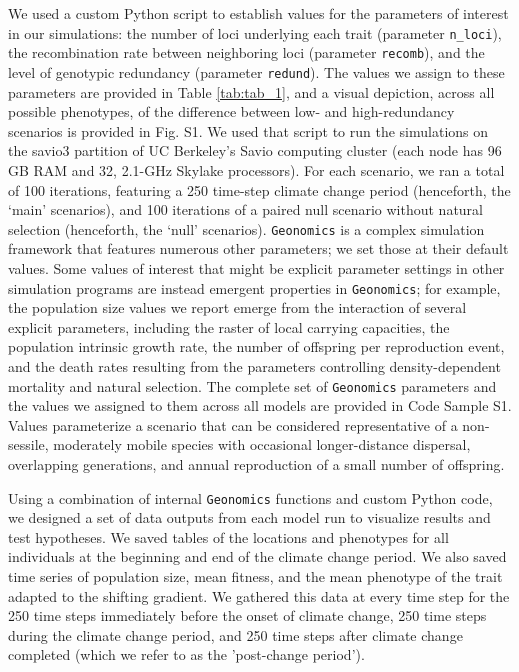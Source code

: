 \documentclass[9pt,twocolumn,twoside,lineno]{new_article}
\begin{document}
We used a custom Python script to establish values for the parameters of interest in our simulations: the number of loci underlying
each trait (parameter \texttt{n\_loci}),
the recombination rate between neighboring loci
(parameter \texttt{recomb}),
and the level of genotypic redundancy (parameter \texttt{redund}).
The values we assign to these parameters are provided in Table \ref{tab:tab_1}, and a visual depiction, across all possible phenotypes, of the difference between low- and high-redundancy scenarios is provided in Fig. S1.
We used that script to run the simulations on the 
savio3 partition of UC Berkeley’s Savio computing cluster (each node has 96 GB RAM and 32, 
2.1-GHz Skylake processors). For each scenario, we ran a total of 100 iterations, featuring a 250 time-step climate change period (henceforth, 
the ‘main’ scenarios), and 100 iterations of a paired null scenario without natural 
selection (henceforth, the ‘null’ scenarios). 
\texttt{Geonomics} is a complex simulation framework that features numerous other 
parameters; we set those at their default values.
Some values of interest that might be explicit parameter settings in
other simulation programs are instead
emergent properties in \texttt{Geonomics}; for example, the population size values we report emerge from the interaction
of several explicit parameters, including the raster of local carrying capacities,
the population intrinsic growth rate, the number of offspring per reproduction event,
and the death rates resulting from the parameters controlling density-dependent mortality
and natural selection.
The complete set of \texttt{Geonomics} parameters and the values 
we assigned to them across all models are provided in Code Sample S1.
Values parameterize a scenario that can be considered representative
of a non-sessile, moderately mobile species with occasional longer-distance dispersal,
overlapping generations, and annual reproduction of a small number of offspring.

Using a combination of internal \texttt{Geonomics} functions and custom Python code, we 
designed a set of data outputs from each model run
to visualize results and test hypotheses.
We saved tables of the locations and phenotypes for all individuals at
the beginning and end of the climate change period. We also saved time 
series of population size, mean fitness, and the mean phenotype of the trait adapted to 
the shifting gradient. We gathered this data at every time step for the 250 time steps immediately 
before the onset of climate change, 250 time steps during the climate change period, and 250 time steps after climate change completed (which we refer to as the 'post-change period').
\end{document}
